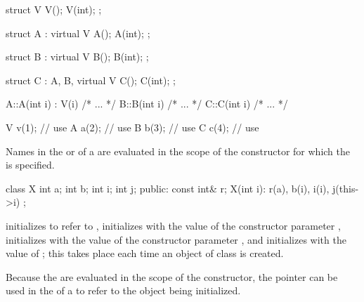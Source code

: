 \pnum
\begin{example}
\begin{codeblock}
struct V {
  V();
  V(int);
};

struct A : virtual V {
  A();
  A(int);
};

struct B : virtual V {
  B();
  B(int);
};

struct C : A, B, virtual V {
  C();
  C(int);
};

A::A(int i) : V(i) { /* ... */ }
B::B(int i) { /* ... */ }
C::C(int i) { /* ... */ }

V v(1);             // use 
A a(2);             // use 
B b(3);             // use 
C c(4);             // use 
\end{codeblock}
\end{example}

\pnum
{}%
Names in the
or 
of a
are evaluated in the scope of the constructor for which the
is specified.
\begin{example}

\begin{codeblock}
class X {
  int a;
  int b;
  int i;
  int j;
public:
  const int& r;
  X(int i): r(a), b(i), i(i), j(this->i) { }
};
\end{codeblock}

initializes
to refer to
,
initializes
with the value of the constructor parameter
,
initializes
with the value of the constructor parameter
,
and initializes
with the value of
;
this takes place each time an object of class
is created.
\end{example}
\begin{note}
Because the
are evaluated in the scope of the constructor, the
pointer can be used in the
of a
to refer to the object being initialized.
\end{note}


